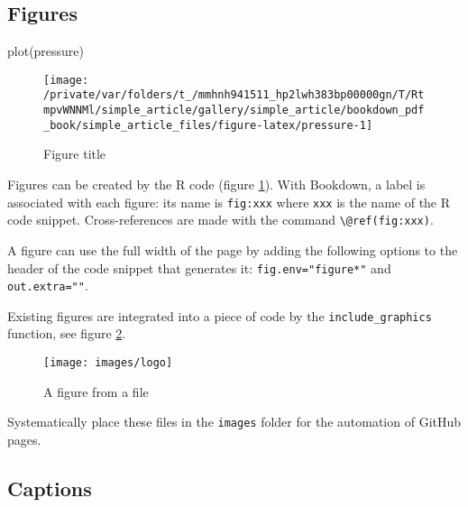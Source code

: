 \documentclass[fleqn,]{article} %
\newenvironment{Shaded}{\begin{snugshade}}{\end{snugshade}}
\newcommand{\FunctionTok}[1]{\textcolor[rgb]{0.00,0.00,0.00}{{#1}}}
\newcommand{\NormalTok}[1]{{#1}}
\begin{document}
\subsection{Figures}\label{figures}

\scriptsize

\begin{Shaded}
\begin{Highlighting}[]
\FunctionTok{plot}\NormalTok{(pressure)}
\end{Highlighting}
\end{Shaded}

\begin{figure}

{\centering \texttt{[image: /private/var/folders/t\_/mmhnh941511\_hp2lwh383bp00000gn/T/RtmpvWNNMl/simple\_article/gallery/simple\_article/bookdown\_pdf\_book/simple\_article\_files/figure-latex/pressure-1]} 

}

\caption{Figure title}\label{fig:pressure}
\end{figure}

\normalsize

Figures can be created by the R code (figure \ref{fig:pressure}).
With Bookdown, a label is associated with each figure: its name is \texttt{fig:xxx} where \texttt{xxx} is the name of the R code snippet.
Cross-references are made with the command \texttt{\textbackslash{}@ref(fig:xxx)}.

A figure can use the full width of the page by adding the following options to the header of the code snippet that generates it: \texttt{fig.env="figure*"} and \texttt{out.extra=""}.

Existing figures are integrated into a piece of code by the \texttt{include\_graphics} function, see figure \ref{fig:logo}.

\scriptsize

\begin{figure}

{\centering \texttt{[image: images/logo]} 

}

\caption{A figure from a file}\label{fig:logo}
\end{figure}

\normalsize

Systematically place these files in the \texttt{images} folder for the automation of GitHub pages.

\subsection{Captions}\label{captions}
\end{document}
